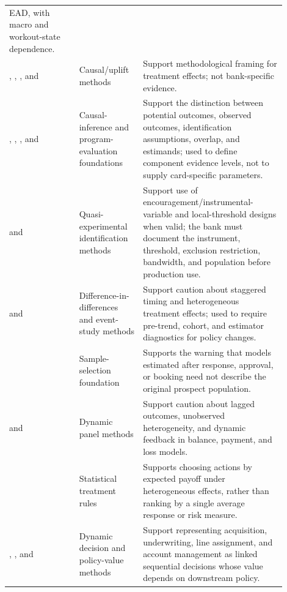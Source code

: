 \documentclass[11pt]{article}
\newcommand{\1}{\mathbf{1}}
\begin{document}
\begin{longtable}{p{0.23\linewidth}p{0.20\linewidth}p{0.47\linewidth}}
    EAD, with macro and workout-state dependence. \\
\citet{rosenbaum1983propensity}, \citet{lo2002true},
\citet{wager2018causalforests}, and \citet{chernozhukov2018dml}
  & Causal/uplift methods
  & Support methodological framing for treatment effects; not bank-specific
    evidence. \\
\citet{imbensrubin2015causal}, \citet{angrist2009mostlyharmless},
\citet{imbenswooldridge2009recent}, and \citet{hernanrobins2020causal}
  & Causal-inference and program-evaluation foundations
  & Support the distinction between potential outcomes, observed outcomes,
    identification assumptions, overlap, and estimands; used to define
    component evidence levels, not to supply card-specific parameters. \\
\citet{angristimbensrubin1996iv} and \citet{lee2010rd}
  & Quasi-experimental identification methods
  & Support use of encouragement/instrumental-variable and local-threshold
    designs when valid; the bank must document the instrument, threshold,
    exclusion restriction, bandwidth, and population before production use. \\
\citet{callaway2021did} and \citet{sun2021eventstudy}
  & Difference-in-differences and event-study methods
  & Support caution about staggered timing and heterogeneous treatment effects;
    used to require pre-trend, cohort, and estimator diagnostics for policy
    changes. \\
\citet{heckman1979selection}
  & Sample-selection foundation
  & Supports the warning that models estimated after response, approval, or
    booking need not describe the original prospect population. \\
\citet{arellano1991panel} and \citet{blundell1998initial}
  & Dynamic panel methods
  & Support caution about lagged outcomes, unobserved heterogeneity, and
    dynamic feedback in balance, payment, and loss models. \\
\citet{manski2004treatment}
  & Statistical treatment rules
  & Supports choosing actions by expected payoff under heterogeneous effects,
    rather than ranking by a single average response or risk measure. \\
\citet{puterman1994mdp}, \citet{murphy2003dynamic}, and
\citet{rust1987replacement}
  & Dynamic decision and policy-value methods
  & Support representing acquisition, underwriting, line assignment, and account
    management as linked sequential decisions whose value depends on downstream
    policy. \\

\end{longtable}
\end{document}
